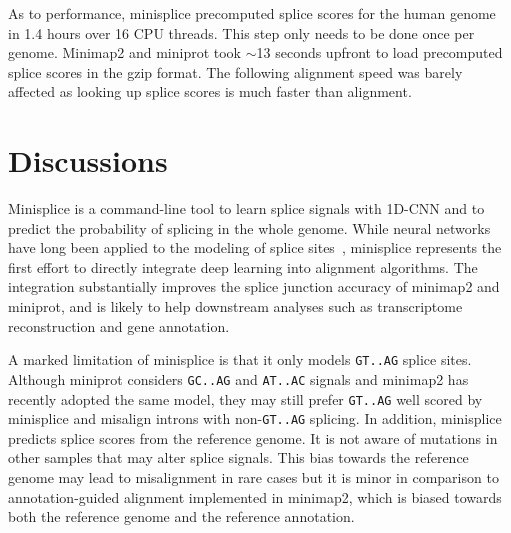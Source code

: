 \documentclass[webpdf,contemporary,large,namedate]{oup-authoring-template}%
\begin{document}
As to performance, minisplice precomputed splice scores for the human genome in 1.4 hours over 16 CPU threads.
This step only needs to be done once per genome.
Minimap2 and miniprot took $\sim$13 seconds upfront to load precomputed splice scores in the gzip format.
The following alignment speed was barely affected as looking up splice scores is much faster than alignment.

\section{Discussions}

Minisplice is a command-line tool to learn splice signals with 1D-CNN
and to predict the probability of splicing in the whole genome.
While neural networks have long been applied to the modeling of splice sites~\citep{Reese:1997aa},
minisplice represents the first effort to directly integrate deep learning into alignment algorithms.
The integration substantially improves the splice junction accuracy of minimap2 and miniprot,
and is likely to help downstream analyses such as transcriptome reconstruction and gene annotation.

A marked limitation of minisplice is that it only models {\tt GT..AG} splice sites.
Although miniprot considers {\tt GC..AG} and {\tt AT..AC} signals and minimap2 has recently adopted the same model,
they may still prefer {\tt GT..AG} well scored by minisplice and misalign introns with non-{\tt GT..AG} splicing.
In addition, minisplice predicts splice scores from the reference genome.
It is not aware of mutations in other samples that may alter splice signals.
This bias towards the reference genome may lead to misalignment in rare cases
but it is minor in comparison to annotation-guided alignment implemented in minimap2,
which is biased towards both the reference genome and the reference annotation.
\end{document}
